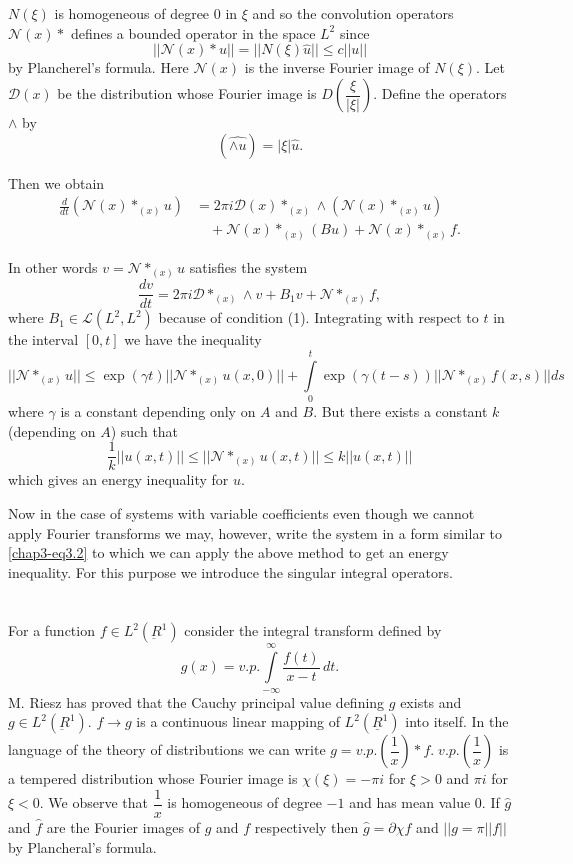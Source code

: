  $N(\xi)$ is homogeneous of degree 0 in $\xi$ and so the convolution
 operators $\mathscr{N} (x) *$ defines a bounded operator in the space
 $L^2$ since  
 $$
 || \mathscr{N} (x) * u || = || N (\xi) \hat{u} || \leq c || u ||  
 $$
 by Plancherel's formula. Here $\mathscr{N}(x)$ is the inverse Fourier 
 image of $N(\xi)$. Let $\mathscr{D}(x)$ be the distribution whose
 Fourier image is $D \left(\dfrac{\xi}{|\xi|}\right)$.   
Define the operators $\wedge$ by 
$$
(\widehat{\wedge u})  = |\xi| \hat{u}. 
$$

Then we obtain 
\begin{align*}
\frac{d}{dt} (\mathscr{N} (x) *_{(x)}u) &= 2\pi i \mathscr{D} (x)
*_{(x)} \wedge (\mathscr{N} (x) *_{(x)} u)\\
&\quad + \mathscr{N} (x) *_{(x)}
(Bu) + \mathscr{N} (x) *_{(x)} f. 
\end{align*}

In other words $v = \mathscr{N} *_{(x)} u$ satisfies the system 
$$
\frac{dv}{dt} = 2 \pi i \mathscr{D} *_{(x)} \wedge v + B_1 v +
\mathscr{N} *_{(x)}f, 
$$\pageoriginale
where $B_1 \in \mathscr{L} (L^2, L^2)$ because of condition
(1). Integrating with respect to $t$ in the interval $[0, t]$ we have
the inequality 
$$
|| \mathscr{N} *_{(x)} u || \leq \exp (\gamma t) || \mathscr{N}*_{(x)} u (x,
0) || + \int\limits^{t}_{0} \exp (\gamma (t-s)) || \mathscr{N} *_{(x)}
f (x,s) || ds  
$$
where $\gamma$ is a constant depending only on $A$ and $B$. But there
exists a constant $k$ (depending on $A$) such that  
$$
\frac{1}{k} || u(x, t) || \leq ||\mathscr{N} *_{(x)} u (x, t) || \leq k
||u(x, t) || 
$$
which gives an energy inequality for $u$.

Now in the case of systems with variable coefficients even though we
cannot apply Fourier transforms we may, however, write the system in a
form similar to \eqref{chap3-eq3.2} to which we can apply the above
method to get an energy inequality. For this purpose we introduce the
singular integral operators. 


\section{}\label{chap3-sec4}%

For a function $f \in L^2 (\underbar{R}^1)$ consider the integral
transform defined by  
\begin{equation}
g (x) = v. p. \int\limits^{\infty}_{-\infty} \frac{f(t)}{x-t}
\, dt. \tag{4.1}\label{chap4-eq4.1} 
 \end{equation} 
 M. Riesz \cite{key1} has proved that the Cauchy principal value defining $g$
 exists and $g \in L^2 (\underbar{R}^1)$. $f \to g$ is a continuous
 linear mapping of $L^2 (\underline{R}^1)$ into itself. In the
 language of the theory of distributions we can write $g =
 v.p. \left(\dfrac{1}{x}\right) * f.\; v.p. \left(\dfrac{1}{x}
 \right)$ is a tempered distribution whose\pageoriginale
 Fourier image is $\chi (\xi) = - \pi i $ for $\xi > 0$ and $\pi i$
 for $\xi < 0$. We observe that $\dfrac{1}{x}$ is homogeneous of
 degree $-1$ and has mean value 0. If $\hat{g}$ and $\hat{f}$ are the
 Fourier images of $g$ and $f$ respectively then $\hat{g} = \partial
 \chi \hat{f}$ and $|| g = \pi || f ||$ by Plancheral's formula. 
 
